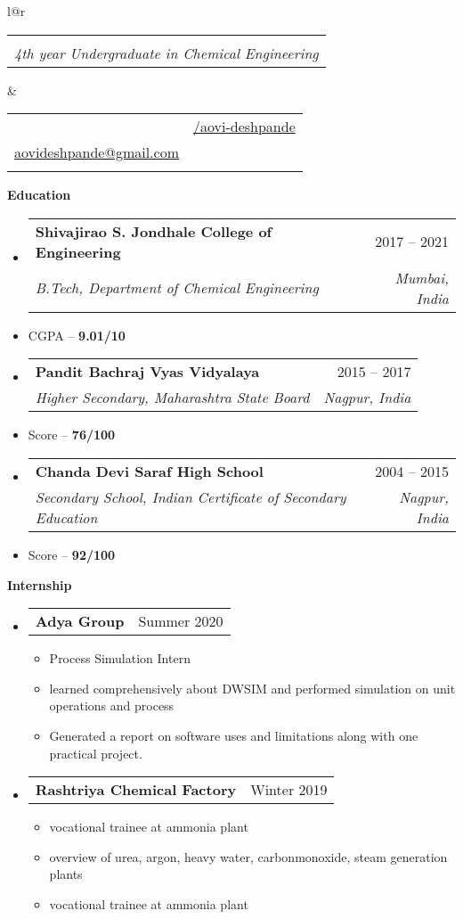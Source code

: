 \documentclass[letterpaper,12pt]{article}[leftmargin=*]
\makeatletter
\def \fullname {Aovi Deshpande}
\def \subtitle {4th year Undergraduate in Chemical Engineering}
\def \linkedinicon {\faLinkedin}
\def \linkedinlink {https://www.linkedin.com/in/aovi-deshpande-9b29a8185}
\def \linkedintext {/aovi-deshpande}
\def \phoneicon {\faPhone}
\def \phonetext {+91 8830167207}
\def \emailicon {\faEnvelope}
\def \emaillink {mailto:aovideshpande@gmail.com}
\def \emailtext {aovideshpande@gmail.com}
\def \headertype {\doublecol} %
\def \entryspacing {-0pt}
\def \linkedin {\linkedinicon \hspace{3pt}\href{\linkedinlink}{\linkedintext}}
\def \phone {\phoneicon \hspace{3pt}{ \phonetext}}
\def \email {\emailicon \hspace{3pt}\href{\emaillink}{\emailtext}}
\renewcommand{\section}[2]{\vspace{5pt}
  \colorbox{secondary}{\color{white}\raggedbottom\normalsize\textbf{{#1}{\hspace{7pt}#2}}}
}
\newcommand{\resumeEntryStart}{\begin{itemize}[leftmargin=2.5mm]}
\newcommand{\resumeEntryEnd}{\end{itemize}\vspace{\entryspacing}}
\newcommand{\resumeItemListStart}{\begin{itemize}[leftmargin=4.5mm]}
\newcommand{\resumeItemListEnd}{\end{itemize}}
\newcommand{\resumeItem}[1]{
  \item\small{
    {#1 \vspace{-2pt}}
  }
}
\newcommand{\resumeEntryTSDL}[4]{
  \vspace{-1pt}\item[]
    \begin{tabular*}{0.97\textwidth}{l@{\extracolsep{\fill}}r}
      \textbf{\color{primary}#1} & {\firabook\color{accent}\small#2} \\
      \textit{\color{accent}\small#3} & \textit{\color{accent}\small#4} \\
    \end{tabular*}\vspace{-6pt}
}
\newcommand{\resumeEntryTD}[2]{
  \vspace{-1pt}\item[]
    \begin{tabular*}{0.97\textwidth}{l@{\extracolsep{\fill}}r}
      \textbf{\color{primary}#1} & {\firabook\color{accent}\small#2} \\
    \end{tabular*}\vspace{-6pt}
}
\newcommand{\doublecol}[6]{
  \begin{tabular*}{\textwidth}{l@{\extracolsep{\fill}}r}
    {
      \begin{tabular}[c]{l}
        \fontsize{35}{45}\selectfont{\color{primary}{{\textbf{\fullname}}}} \\
        {\textit{\subtitle}} %
      \end{tabular}
    } & {
      \begin{tabular}[c]{l@{\hspace{1.5em}}l}
        {\small#4} & {\small#1} \\
        {\small#5} & {\small#2} \\
        {\small#6} & {\small#3}
      \end{tabular}
    }
  \end{tabular*}
}
\newcommand{\singlecol}[6]{
  \begin{tabular*}{\textwidth}{l@{\extracolsep{\fill}}r}
    {
      \begin{tabular}[b]{l}
        \fontsize{35}{45}\selectfont{\color{primary}{{\textbf{\fullname}}}} \\
        {\textit{\subtitle}} %
      \end{tabular}
    } & {
      \begin{tabular}[c]{l}
        {\small#1} \\
        {\small#2} \\
        {\small#3} \\
        {\small#4} \\
        {\small#5} \\
        {\small#6}
      \end{tabular}
    }
  \end{tabular*}
}
\makeatother
\begin{document}
\headertype{\linkedin}{}{}{\phone}{\email}{} %
\vspace{3pt} %

\section{\faGraduationCap}{Education}

\resumeEntryStart
  \resumeEntryTSDL
      {Shivajirao S. Jondhale College of Engineering}{2017 -- 2021}
      {B.Tech, Department of Chemical Engineering}{Mumbai, India}
     \item[]\small{\color{primary}CGPA -- { \textbf{9.01/10} \vspace{-6pt}}}
  \resumeEntryEnd
  \vspace{3pt}


\resumeEntryStart
  \resumeEntryTSDL
      {Pandit Bachraj Vyas Vidyalaya}{2015 -- 2017}
      {Higher Secondary, Maharashtra State Board}{Nagpur, India}
     \item[]\small{\color{primary}Score -- { \textbf{76/100} \vspace{-6pt}}}
  \resumeEntryEnd
  \vspace{3pt}


\resumeEntryStart
  \resumeEntryTSDL
      {Chanda Devi Saraf High School}{2004 -- 2015}
      {Secondary School, Indian Certificate of Secondary Education}{Nagpur, India}
     \item[]\small{\color{primary}Score -- { \textbf{92/100} \vspace{-6pt}}}
  \resumeEntryEnd
  \vspace{3pt}


  \vspace{4pt}
  
\section{\faTrophy}{Internship}

  \resumeEntryStart
      \resumeEntryTD
      {Adya Group}{Summer 2020}
    \resumeItemListStart
      \resumeItem{Process Simulation  Intern}
      \resumeItem{learned comprehensively about DWSIM and performed simulation on unit operations and process}
      \resumeItem{Generated a report on software uses and  limitations along with one practical project.}
    \resumeItemListEnd
  \resumeEntryEnd


  \resumeEntryStart
      \resumeEntryTD
      {Rashtriya Chemical Factory}{Winter 2019}
    \resumeItemListStart
      \resumeItem{vocational trainee at ammonia plant}
      \resumeItem{overview of urea, argon, heavy water, carbonmonoxide, steam generation plants}
      \resumeItem{vocational trainee at ammonia plant}
    \resumeItemListEnd
  \resumeEntryEnd
\end{document}
